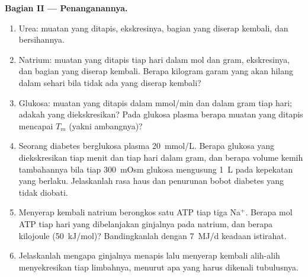 \begin{problem}
\medskip
\noindent\textbf{Bagian II --- Penanganannya.}
\begin{enumerate}[resume]
  \item Urea: muatan yang ditapis, ekskresinya, bagian yang diserap kembali, dan
        bersihannya.
  \item Natrium: muatan yang ditapis tiap hari dalam mol dan gram, ekskresinya,
        dan bagian yang diserap kembali. Berapa kilogram garam yang akan
        hilang dalam sehari bila tidak ada yang diserap kembali?
  \item Glukosa: muatan yang ditapis dalam mmol/min dan dalam gram tiap hari; adakah yang
        diekskresikan? Pada glukosa plasma berapa muatan yang ditapis mencapai
        $T_{m}$ (yakni ambangnya)?
  \item Seorang diabetes berglukosa plasma \qty{20}{mmol/L}. Berapa glukosa yang diekskresikan
        tiap menit dan tiap hari dalam gram, dan berapa volume kemih tambahannya bila
        tiap \qty{300}{mOsm} glukosa mengusung \qty{1}{L} pada
        kepekatan yang berlaku. Jelaskanlah rasa haus dan penurunan bobot
        diabetes yang tidak diobati.
  \item Menyerap kembali natrium berongkos satu ATP tiap tiga Na$^{+}$. Berapa
        mol ATP tiap hari yang dibelanjakan ginjalnya pada natrium, dan berapa
        kilojoule (\qty{50}{kJ/mol})? Bandingkanlah dengan
        \qty{7}{MJ/d} keadaan istirahat.
  \item Jelaskanlah mengapa ginjalnya menapis lalu menyerap kembali alih-alih
        menyekresikan tiap limbahnya, menurut apa yang harus dikenali
        tubulusnya.
\end{enumerate}


\end{problem}
